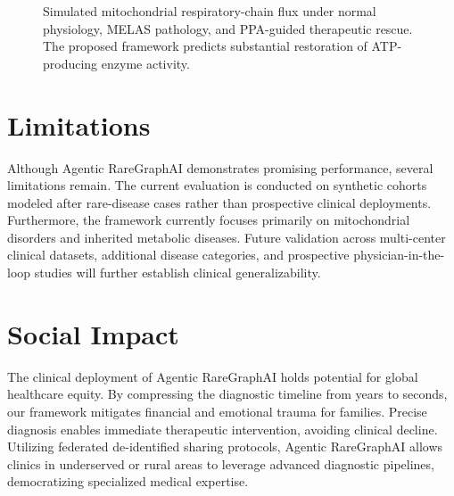 \documentclass[conference]{IEEEtran}
\begin{document}
\begin{figure}[!t]

\caption{Simulated mitochondrial respiratory-chain flux under normal physiology, MELAS pathology, and PPA-guided therapeutic rescue. The proposed framework predicts substantial restoration of ATP-producing enzyme activity.}
\label{fig_flux}
\end{figure}

\section{Limitations}
Although Agentic RareGraphAI demonstrates promising performance, several limitations remain. The current evaluation is conducted on synthetic cohorts modeled after rare-disease cases rather than prospective clinical deployments. Furthermore, the framework currently focuses primarily on mitochondrial disorders and inherited metabolic diseases. Future validation across multi-center clinical datasets, additional disease categories, and prospective physician-in-the-loop studies will further establish clinical generalizability.

\section{Social Impact}
The clinical deployment of Agentic RareGraphAI holds potential for global healthcare equity. By compressing the diagnostic timeline from years to seconds, our framework mitigates financial and emotional trauma for families. Precise diagnosis enables immediate therapeutic intervention, avoiding clinical decline. Utilizing federated de-identified sharing protocols, Agentic RareGraphAI allows clinics in underserved or rural areas to leverage advanced diagnostic pipelines, democratizing specialized medical expertise.
\end{document}
